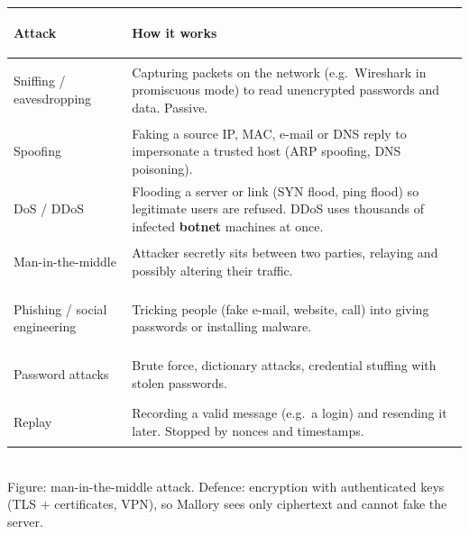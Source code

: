 \documentclass[10pt]{article}
\begin{document}
\begin{tabularx}{\linewidth}{@{}>{\bfseries\raggedright\arraybackslash}p{2.7cm}X@{}}
\toprule
Attack & How it works\\\midrule
Sniffing / eavesdropping & Capturing packets on the network (e.g.\ Wireshark in promiscuous mode) to read unencrypted passwords and data. Passive.\\
Spoofing & Faking a source IP, MAC, e-mail or DNS reply to impersonate a trusted host (ARP spoofing, DNS poisoning).\\
DoS / DDoS & Flooding a server or link (SYN flood, ping flood) so legitimate users are refused. DDoS uses thousands of infected \textbf{botnet} machines at once.\\
Man-in-the-middle & Attacker secretly sits between two parties, relaying and possibly altering their traffic.\\
Phishing / social engineering & Tricking people (fake e-mail, website, call) into giving passwords or installing malware.\\
Password attacks & Brute force, dictionary attacks, credential stuffing with stolen passwords.\\
Replay & Recording a valid message (e.g.\ a login) and resending it later. Stopped by nonces and timestamps.\\
\bottomrule
\end{tabularx}

\begin{center}
\\
{\scriptsize\color{midgrey}Figure: man-in-the-middle attack. Defence: encryption with authenticated keys (TLS + certificates, VPN), so Mallory sees only ciphertext and cannot fake the server.}
\end{center}
\end{document}
